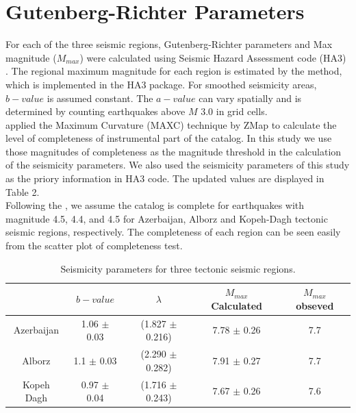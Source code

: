 \documentclass{article}
\begin{document}
\section{ Gutenberg-Richter Parameters}
For each of the three seismic regions, Gutenberg-Richter parameters and Max magnitude ($M_{max}$) were calculated using Seismic Hazard Assessment code (HA3) \citep{kijko2004}. The regional maximum magnitude for each region is estimated by the \citet{Kijko1989} method, which is implemented in the HA3 package. For smoothed seismicity areas, $b-value$ is assumed constant. The $a-value$ can vary spatially and is determined by counting earthquakes above $M$ 3.0 in grid cells.\\
\noindent
\citet{Karimiparidari2013} applied the Maximum Curvature (MAXC) technique \citep{Wyss1999, Wiemer2000} by ZMap \citep{Wiemer2001} to calculate the level of completeness of instrumental part of the catalog. In this study we use those magnitudes of completeness as the magnitude threshold in the calculation of the seismicity parameters. We also used the seismicity parameters of this study \citep{Karimiparidari2013} as the priory information in HA3 code. The updated values are displayed in Table 2. \\
\noindent
Following the \citet{Karimiparidari2013}, we assume the catalog is complete for earthquakes with magnitude 4.5, 4.4, and 4.5 for Azerbaijan, Alborz and Kopeh-Dagh tectonic seismic regions, respectively. The completeness of each region can be seen easily from the scatter plot of completeness test. 

\begin{table}[h]
\centering
\caption{Seismicity parameters for three tectonic seismic regions.}
    \begin{tabular}{ccccc}
    ~                   & $b-value$            & $\lambda$                  & $M_{max}$ Calculated & $M_{max}$ obseved \\ \hline
    Azerbaijan    & 1.06 $\pm$ 0.03  & (1.827  $\pm$ 0.216) & 7.78  $\pm$ 0.26           & 7.7          \\ \hline
    Alborz           & 1.1  $\pm$ 0.03   & (2.290  $\pm$ 0.282) & 7.91  $\pm$ 0.27           & 7.7          \\ \hline
    Kopeh Dagh & 0.97  $\pm$ 0.04 & (1.716  $\pm$ 0.243) & 7.67  $\pm$ 0.26           & 7.6          \\
    \end{tabular}
  
\end{table}
\end{document}
